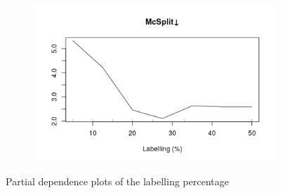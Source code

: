 \documentclass{l4proj}
\theoremstyle{definition}
\theoremstyle{remark}
\begin{document}
\begin{figure}
\begin{subfigure}[t]{0.49\textwidth}
    \centering
    \includegraphics[width=\textwidth]{images/_both_labels_mcsplitdown_labelling_.png}
  \end{subfigure}
  \caption{Partial dependence plots of the labelling percentage}
  \label{fig:both_labels_partials2}
\end{figure}
\end{document}
